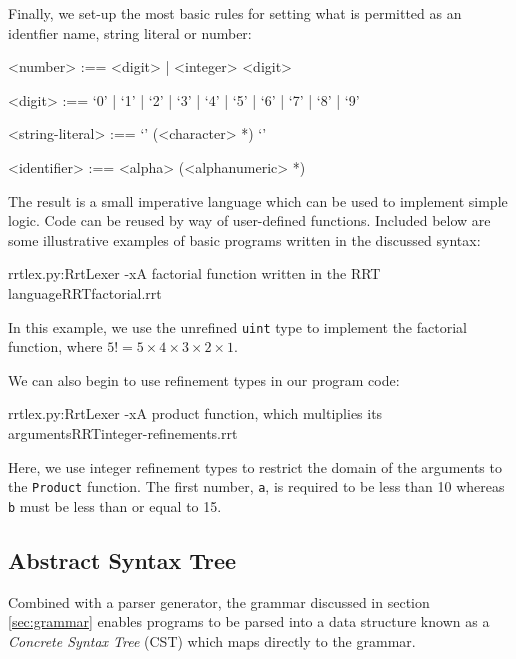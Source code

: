 \documentclass[a4paper,openany,12pt]{book}
\begin{document}
Finally, we set-up the most basic rules for setting what is permitted as an identfier name, string literal or
number:

\begin{grammar}
    <number> :== <digit> | <integer> <digit>

    <digit> :== `0' | `1' | `2' | `3' | `4' | `5' | `6' | `7' | `8' | `9'

    <string-literal> :== `\textquotedbl{}' (<character> *) `\textquotedbl{}'

    <identifier> :== <alpha> (<alphanumeric> *)
\end{grammar}

The result is a small imperative language which can be used to implement simple logic.
Code can be reused by way of user-defined functions.
Included below are some illustrative examples of basic programs written in the discussed syntax:

\begin{mycodefile}{rrtlex.py:RrtLexer -x}{\label{code:rrt:1}A factorial function written in the RRT language}{RRT}{factorial.rrt}
    \vspace{0.5em}

    In this example, we use the unrefined \texttt{uint} type to implement the factorial function, where
    $5! = 5\times 4 \times 3 \times 2 \times 1$.
\end{mycodefile}

We can also begin to use refinement types in our program code:

\begin{mycodefile}{rrtlex.py:RrtLexer -x}{\label{code:rrt:2}A product function, which multiplies its arguments}{RRT}{integer-refinements.rrt}
    \vspace{0.5em}

    Here, we use integer refinement types to restrict the domain of the arguments to the \texttt{Product}
    function.
    The first number, \texttt{a}, is required to be less than 10 whereas \texttt{b} must be less than or equal to 15.
\end{mycodefile}

\label{sec:grammar}

\subsection{Abstract Syntax Tree}

Combined with a parser generator, the grammar discussed in section \ref{sec:grammar} enables programs to be parsed into
a data structure known as a \emph{Concrete Syntax Tree} (CST) which maps directly to the grammar.
\end{document}
